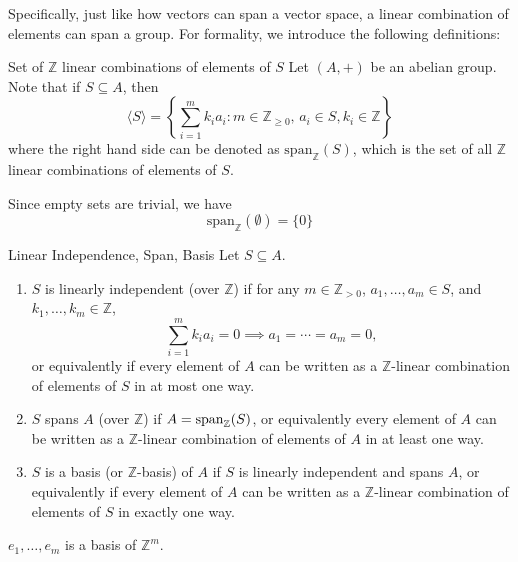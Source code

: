 \documentclass{article}
\begin{document}
Specifically, just like how vectors can span a vector space, a linear combination of elements can span a group. For formality, we introduce the following definitions:
\begin{definition}{Set of $\mathbb{Z}$ linear combinations of elements of $S$}
    Let $(A,+)$ be an abelian group. Note that if $S \subseteq A$, then
    \begin{equation*}
        \langle S \rangle = \left\{\sum_{i=1}^{m}k_ia_i:m\in \mathbb{Z}_{\ge 0},\,a_i \in S, k_i \in \mathbb{Z}\right\}
    \end{equation*}
    where the right hand side can be denoted as $\text{span}_{\mathbb{Z}}(S)$, which is the set of all $\mathbb{Z}$ linear combinations of elements of $S$.
\end{definition}
Since empty sets are trivial, we have
\begin{equation*}
    \text{span}_{\mathbb{Z}}(\emptyset) = \{0\}
\end{equation*}
\begin{definition}{Linear Independence, Span, Basis}
    Let $S \subseteq A$.
    \begin{enumerate}
        \item $S$ is linearly independent (over $\mathbb{Z}$) if for any $m\in \mathbb{Z}_{>0}$, $a_1,\dots,a_m \in S$, and $k_1,\dots,k_m \in \mathbb{Z}$,
              \begin{equation*}
                  \sum_{i=1}^{m} k_ia_i = 0 \implies a_1=\cdots=a_m=0,
              \end{equation*}
              or equivalently if every element of $A$ can be written as a $\mathbb{Z}$-linear combination of elements of $S$ in at most one way.
        \item $S$ spans $A$ (over $\mathbb{Z}$) if $A=\mathrm{span}_{\mathbb{Z}}(S)$, or equivalently every element of $A$ can be written as a $\mathbb{Z}$-linear combination of elements of $A$ in at least one way.
        \item $S$ is a basis (or $\mathbb{Z}$-basis) of $A$ if $S$ is linearly independent and spans $A$, or equivalently if every element of $A$ can be written as a $\mathbb{Z}$-linear combination of elements of $S$ in exactly one way.
    \end{enumerate}
\end{definition}
\begin{example}
    $e_1,\dots,e_m$ is a basis of $\mathbb{Z}^m$.
\end{example}
\end{document}
